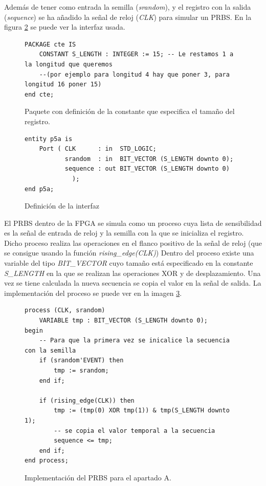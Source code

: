 \documentclass{article}
\begin{document}
	Además de tener como entrada la semilla (\emph{srandom}), y el registro con la salida (\emph{sequence}) se ha añadido la señal de reloj (\emph{CLK}) para simular un PRBS. En la figura \ref{cod:p5a:entity} se puede ver la interfaz usada.
	
\begin{figure}[h]
	\begin{lstlisting}[style=vhdl]
PACKAGE cte IS
	CONSTANT S_LENGTH : INTEGER := 15; -- Le restamos 1 a la longitud que queremos
	--(por ejemplo para longitud 4 hay que poner 3, para longitud 16 poner 15)
end cte;
	\end{lstlisting}
	\caption{Paquete con definición de la constante que especifica el tamaño del registro.}
	\label{cod:p5a:package}
\end{figure}


\begin{figure}[h]
	\begin{lstlisting}[style=vhdl]
entity p5a is
    Port ( CLK      : in  STD_LOGIC;
           srandom  : in  BIT_VECTOR (S_LENGTH downto 0);
           sequence : out BIT_VECTOR (S_LENGTH downto 0)
			 );
end p5a;
	\end{lstlisting}
	\caption{Definición de la interfaz}
	\label{cod:p5a:entity}
\end{figure}

El PRBS dentro de la FPGA se simula como un proceso cuya lista de sensibilidad es la señal de entrada de reloj y la semilla con la que se inicializa el registro. Dicho proceso realiza las operaciones en el flanco positivo de la señal de reloj (que se consigue usando la función \emph{rising\_edge(CLK)}) Dentro del proceso existe una variable del tipo \emph{BIT\_VECTOR} cuyo tamaño está especificado en la constante \emph{S\_LENGTH} en la que se realizan las operaciones XOR y de desplazamiento. Una vez se tiene calculada la nueva secuencia se copia el valor en la señal de salida. La implementación del proceso se puede ver en la imagen \ref{cod:p5a:process}.
	
\begin{figure}[h]
	\begin{lstlisting}[style=vhdl]
process (CLK, srandom)
	VARIABLE tmp : BIT_VECTOR (S_LENGTH downto 0);
begin
	-- Para que la primera vez se inicalice la secuencia con la semilla
	if (srandom'EVENT) then
		tmp := srandom;
	end if;
	
	if (rising_edge(CLK)) then
		tmp := (tmp(0) XOR tmp(1)) & tmp(S_LENGTH downto 1);
		-- se copia el valor temporal a la secuencia
		sequence <= tmp;
	end if;
end process;
	\end{lstlisting}
	\caption{Implementación del PRBS para el apartado A.}
	\label{cod:p5a:process}
\end{figure}
\end{document}
